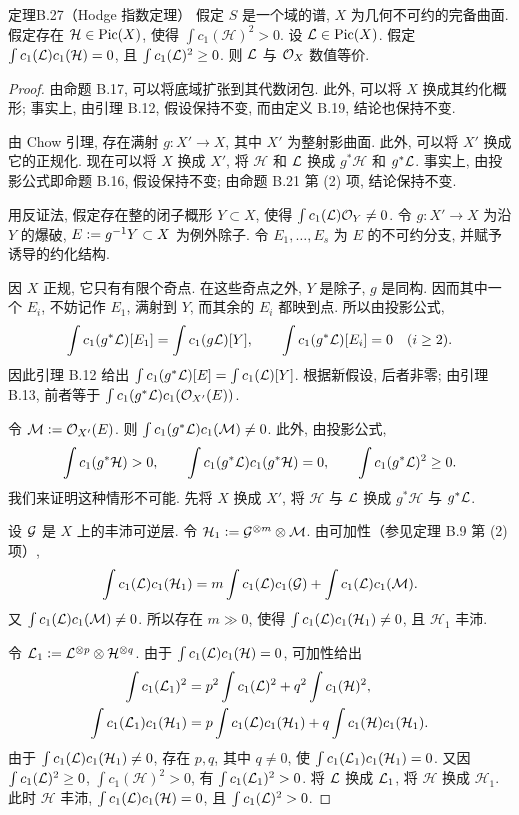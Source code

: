 \begin{origstatement}{定理}{B.27（Hodge 指数定理）}\label{appB:27}
假定 $S$ 是一个域的谱, $X$ 为几何不可约的完备曲面. 假定存在 $\mathcal H\in\operatorname{Pic}(X)$, 使得 $\int c_1(\mathcal H)^2>0$. 设 $\mathcal L\in\operatorname{Pic}(X)$. 假定 $\int c_1(\mathcal L)c_1(\mathcal H)=0$, 且 $\int c_1(\mathcal L)^2\ge0$. 则 $\mathcal L$ 与 $\mathcal O_X$ 数值等价.
\end{origstatement}
\begin{proof}
由命题 B.17, 可以将底域扩张到其代数闭包. 此外, 可以将 $X$ 换成其约化概形; 事实上, 由引理 B.12, 假设保持不变, 而由定义 B.19, 结论也保持不变.

由 Chow 引理, 存在满射 $g\colon X'\to X$, 其中 $X'$ 为整射影曲面. 此外, 可以将 $X'$ 换成它的正规化. 现在可以将 $X$ 换成 $X'$, 将 $\mathcal H$ 和 $\mathcal L$ 换成 $g^*\mathcal H$ 和 $g^*\mathcal L$. 事实上, 由投影公式即命题 B.16, 假设保持不变; 由命题 B.21 第 (2) 项, 结论保持不变.

用反证法, 假定存在整的闭子概形 $Y\subset X$, 使得 $\int c_1(\mathcal L)\mathcal O_Y\ne0$. 令 $g\colon X'\to X$ 为沿 $Y$ 的爆破, $E\mathrel{\mathop:}= g^{-1}Y\subset X$ 为例外除子. 令 $E_1,\ldots,E_s$ 为 $E$ 的不可约分支, 并赋予诱导的约化结构.

因 $X$ 正规, 它只有有限个奇点. 在这些奇点之外, $Y$ 是除子, $g$ 是同构. 因而其中一个 $E_i$, 不妨记作 $E_1$, 满射到 $Y$, 而其余的 $E_i$ 都映到点. 所以由投影公式,
\[\int c_1(g^*\mathcal L)[E_1]=\int c_1(g\mathcal L)[Y],\qquad
\int c_1(g^*\mathcal L)[E_i]=0\quad(i\ge2).\]
因此引理 B.12 给出 $\int c_1(g^*\mathcal L)[E]=\int c_1(\mathcal L)[Y]$. 根据新假设, 后者非零; 由引理 B.13, 前者等于 $\int c_1(g^*\mathcal L)c_1(\mathcal O_{X'}(E))$.

令 $\mathcal M\mathrel{\mathop:}=\mathcal O_{X'}(E)$. 则 $\int c_1(g^*\mathcal L)c_1(\mathcal M)\ne0$. 此外, 由投影公式,
\[\int c_1(g^*\mathcal H)>0,\qquad
\int c_1(g^*\mathcal L)c_1(g^*\mathcal H)=0,\qquad
\int c_1(g^*\mathcal L)^2\ge0.\]
我们来证明这种情形不可能. 先将 $X$ 换成 $X'$, 将 $\mathcal H$ 与 $\mathcal L$ 换成 $g^*\mathcal H$ 与 $g^*\mathcal L$.

设 $\mathcal G$ 是 $X$ 上的丰沛可逆层. 令 $\mathcal H_1\mathrel{\mathop:}=\mathcal G^{\otimes m}\otimes\mathcal M$. 由可加性（参见定理 B.9 第 (2) 项）,
\[\int c_1(\mathcal L)c_1(\mathcal H_1)=m\int c_1(\mathcal L)c_1(\mathcal G)+\int c_1(\mathcal L)c_1(\mathcal M).\]
又 $\int c_1(\mathcal L)c_1(\mathcal M)\ne0$. 所以存在 $m\gg0$, 使得 $\int c_1(\mathcal L)c_1(\mathcal H_1)\ne0$, 且 $\mathcal H_1$ 丰沛.

令 $\mathcal L_1\mathrel{\mathop:}=\mathcal L^{\otimes p}\otimes\mathcal H^{\otimes q}$. 由于 $\int c_1(\mathcal L)c_1(\mathcal H)=0$, 可加性给出
\begin{align*}
\int c_1(\mathcal L_1)^2&=p^2\int c_1(\mathcal L)^2+q^2\int c_1(\mathcal H)^2,\\
\int c_1(\mathcal L_1)c_1(\mathcal H_1)&=p\int c_1(\mathcal L)c_1(\mathcal H_1)+q\int c_1(\mathcal H)c_1(\mathcal H_1).
\end{align*}
由于 $\int c_1(\mathcal L)c_1(\mathcal H_1)\ne0$, 存在 $p,q$, 其中 $q\ne0$, 使 $\int c_1(\mathcal L_1)c_1(\mathcal H_1)=0$. 又因 $\int c_1(\mathcal L)^2\ge0$, $\int c_1(\mathcal H)^2>0$, 有 $\int c_1(\mathcal L_1)^2>0$. 将 $\mathcal L$ 换成 $\mathcal L_1$, 将 $\mathcal H$ 换成 $\mathcal H_1$. 此时 $\mathcal H$ 丰沛, $\int c_1(\mathcal L)c_1(\mathcal H)=0$, 且 $\int c_1(\mathcal L)^2>0$.


\end{proof}
